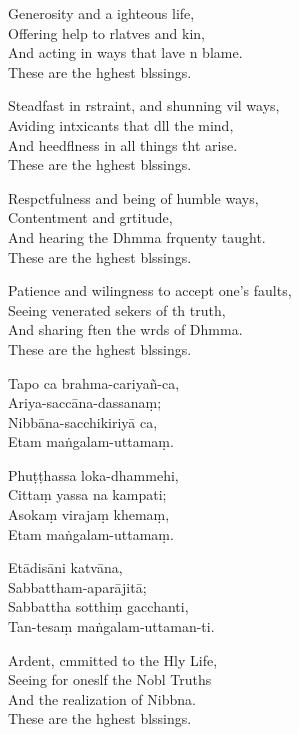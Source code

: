 Generosity and a ighteous life,\\
Offering help to rlatves and kin,\\
And acting in ways that lave n blame.\\
These are the hghest blssings.

Steadfast in rstraint, and shunning vil ways,\\
Aviding intxicants that dll the mind,\\
And heedflness in all things tht arise.\\
These are the hghest blssings.

Respctfulness and being of humble ways,\\
Contentment and grtitude,\\
And hearing the Dhmma frquenty taught.\\
These are the hghest blssings.

Patience and wilingness to accept one's faults,\\
Seeing venerated sekers of th truth,\\
And sharing ften the wrds of Dhmma.\\
These are the hghest blssings.

\clearpage

Tapo ca brahma-cariyañ-ca,\\%
Ariya-saccāna-dassanaṃ;\\
Nibbāna-sacchikiriyā ca,\\
Etam maṅgalam-uttamaṃ.

Phuṭṭhassa loka-dhammehi,\\
Cittaṃ yassa na kampati;\\
Asokaṃ virajaṃ khemaṃ,\\
Etam maṅgalam-uttamaṃ.

Etādisāni katvāna,\\
Sabbattham-aparājitā;\\
Sabbattha sotthiṃ gacchanti,\\
Tan-tesaṃ maṅgalam-uttaman-ti.




\clearpage

Ardent, cmmitted to the Hly Life,\\%
Seeing for oneslf the Nobl Truths\\
And the realization of Nibbna.\\
These are the hghest blssings.

